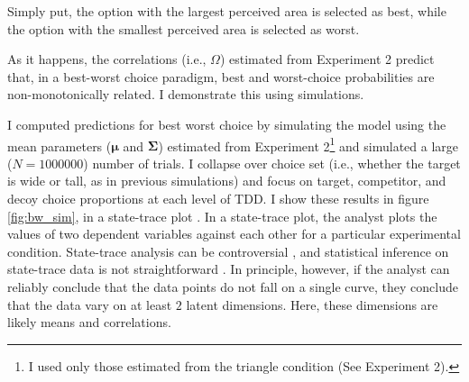 Simply put, the option with the largest perceived area is selected as best, while the option with the smallest perceived area is selected as worst. 

As it happens, the correlations (i.e., $\Omega$) estimated from Experiment 2 predict that, in a best-worst choice paradigm, best and worst-choice probabilities are non-monotonically related. I demonstrate this using simulations.

I computed predictions for best worst choice by simulating the model using the mean parameters ($\boldsymbol{\mu}$ and $\boldsymbol{\Sigma}$) estimated from Experiment 2\footnote{I used only those estimated from the triangle condition (See Experiment 2).} and simulated a large ($N=1000000$) number of trials. I collapse over choice set (i.e., whether the target is wide or tall, as in previous simulations) and focus on target, competitor, and decoy choice proportions at each level of TDD. I show these results in figure \ref{fig:bw_sim}, in a state-trace plot \parencite{newell2008dimensions}. In a state-trace plot, the analyst plots the values of two dependent variables against each other for a particular experimental condition. State-trace analysis can be controversial \parencite{ashby2019state,ashby2022state,stephens2020state}, and statistical inference on state-trace data is not straightforward \parencite{sadil2018hierarchical,davis2016bayes}. In principle, however, if the analyst can reliably conclude that the data points do not fall on a single curve, they conclude that the data vary on at least $2$ latent dimensions. Here, these dimensions are likely means and correlations. 

